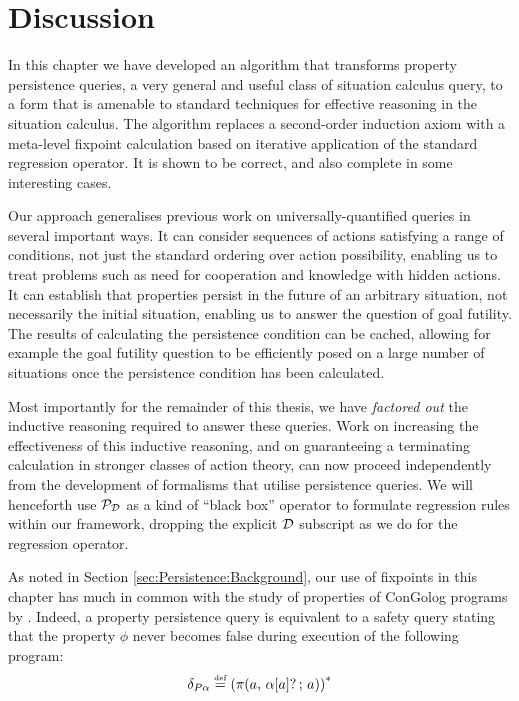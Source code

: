 \section{Discussion\label{sec:Persistence:Discussion}}

In this chapter we have developed an algorithm that transforms property
persistence queries, a very general and useful class of situation
calculus query, to a form that is amenable to standard techniques
for effective reasoning in the situation calculus. The algorithm replaces
a second-order induction axiom with a meta-level fixpoint calculation
based on iterative application of the standard regression operator.
It is shown to be correct, and also complete in some interesting cases.

Our approach generalises previous work on universally-quantified queries
in several important ways. It can consider sequences of actions satisfying
a range of conditions, not just the standard ordering over action
possibility, enabling us to treat problems such as need for cooperation
and knowledge with hidden actions. It can establish that properties
persist in the future of an arbitrary situation, not necessarily the
initial situation, enabling us to answer the question of goal futility.
The results of calculating the persistence condition can be cached,
allowing for example the goal futility question to be efficiently
posed on a large number of situations once the persistence condition
has been calculated.

Most importantly for the remainder of this thesis, we have \emph{factored
out} the inductive reasoning required to answer these queries. Work
on increasing the effectiveness of this inductive reasoning, and on
guaranteeing a terminating calculation in stronger classes of action
theory, can now proceed independently from the development of formalisms
that utilise persistence queries. We will henceforth use $\mathcal{P}_{\mathcal{D}}$
as a kind of {}``black box'' operator to formulate regression rules
within our framework, dropping the explicit $\mathcal{D}$ subscript as we
do for the regression operator.

As noted in Section \ref{sec:Persistence:Background}, our use of
fixpoints in this chapter has much in common with the study of properties
of ConGolog programs by \citep{ternovska97congolog_fixpoint,classen08golog_properties}.
Indeed, a property persistence query is equivalent to a safety query
stating that the property $\phi$ never becomes false during execution
of the following program:\[
\delta_{P\alpha}\stackrel{\mbox{\tiny def}}{=}\left(\pi(a,\,\alpha[a]?\,;\, a)\right)^{*}\]



